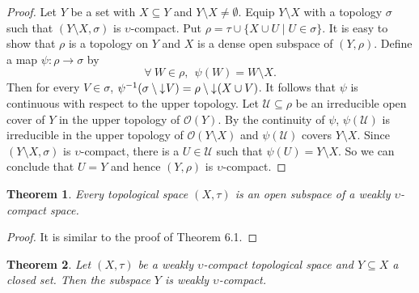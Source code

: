 \documentclass[preprint,12pt]{elsarticle}
\numberwithin{equation}{section}
\newtheorem{theorem}{Theorem}[section]
\newcommand{\dn}{\mathord{\downarrow}\hspace{0.05em}}
\begin{document}
\begin{proof}Let $Y$ be a set with $X\subseteq Y$ and $Y\setminus X\neq\emptyset$. Equip $Y\setminus X$ with a topology $\sigma$ such that $(Y\setminus X,\sigma)$ is $\upsilon$-compact. Put $\rho=\tau\cup\{X\cup U\mid U\in\sigma\}$. It is easy to show that $\rho$ is a topology on $Y$ and $X$ is a dense open subspace of $(Y,\rho)$. Define a map $\psi:\rho\longrightarrow\sigma$ by
$$\forall \ W\in \rho,\ \ \psi(W)=W\setminus X.$$
Then for every $V\in\sigma$, $\psi^{-1}(\sigma\setminus \dn V)=\rho\setminus\dn(X\cup V)$. It follows that $\psi$ is continuous with respect to the upper topology. Let $\mathcal{U}\subseteq\rho$ be an irreducible open cover of $Y$ in the upper topology of $\mathcal{O}(Y)$. By the continuity of $\psi$, $\psi(\mathcal{U})$ is irreducible in the upper topology of $\mathcal{O}(Y\setminus X)$ and $\psi(\mathcal{U})$ covers $Y\setminus X$. Since  $(Y\setminus X,\sigma)$ is $\upsilon$-compact, there is a $U\in\mathcal{U}$ such that $\psi(U)=Y\setminus X$. So we can conclude that $U=Y$ and hence $(Y,\rho)$ is $\upsilon$-compact.\end{proof}

\begin{theorem} Every topological space $(X,\tau)$ is an open subspace of a weakly $\upsilon$-compact space.

\end{theorem}

\begin{proof}It is similar to the proof of Theorem 6.1.\end{proof}


\begin{theorem} Let $(X,\tau)$ be a weakly $\upsilon$-compact topological space and $Y\subseteq X$ a closed set. Then the subspace $Y$ is weakly $\upsilon$-compact.

\end{theorem}
\end{document}
